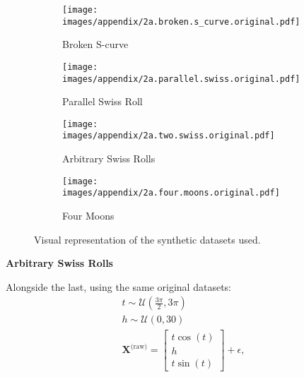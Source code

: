 \documentclass{article} %
\begin{document}
\begin{figure}[t]
  \centering
  \begin{subfigure}[b]{0.25\linewidth}
    \centering
    \texttt{[image: images/appendix/2a.broken.s\_curve.original.pdf]}%
    \caption{Broken S-curve}
    \label{fig:representative-points-orig}
  \end{subfigure}\hfill
  \begin{subfigure}[b]{0.25\linewidth}
    \centering
    \texttt{[image: images/appendix/2a.parallel.swiss.original.pdf]}%
    \caption{Parallel Swiss Roll}
    \label{fig:representative-points-embedded}
  \end{subfigure}\hfill
  \begin{subfigure}[b]{0.25\linewidth}
    \centering
    \texttt{[image: images/appendix/2a.two.swiss.original.pdf]}%
    \caption{Arbitrary Swiss Rolls}
    \label{fig:representative-points-selected}
  \end{subfigure}\hfill
  \begin{subfigure}[b]{0.25\linewidth}
    \centering
    \texttt{[image: images/appendix/2a.four.moons.original.pdf]}%
    \caption{Four Moons}
    \label{fig:representative-points-selected}
  \end{subfigure}
  \caption{Visual representation of the synthetic datasets used.}
  \label{fig:representative-points}
\end{figure}

\newpage

\textbf{Arbitrary Swiss Rolls}

Alongside the last, using the same original datasets:
\begin{align}
t \sim \mathcal{U}\left(\frac{3\pi}{2}, 3\pi\right) \\
 h \sim \mathcal{U}(0, 30) \\
 \mathbf{X}^{\text{(raw)}} = \begin{bmatrix}
t \cos(t) \\
h \\
t \sin(t)
\end{bmatrix} + \epsilon, \\
\\
\end{align}
\end{document}
